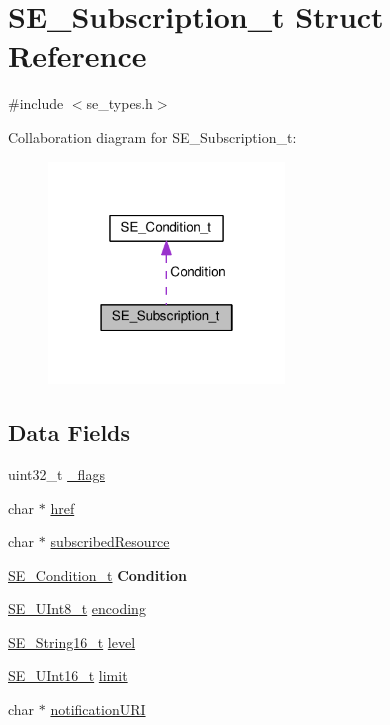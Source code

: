 \hypertarget{structSE__Subscription__t}{}\section{S\+E\+\_\+\+Subscription\+\_\+t Struct Reference}
\label{structSE__Subscription__t}


{\ttfamily \#include $<$se\+\_\+types.\+h$>$}



Collaboration diagram for S\+E\+\_\+\+Subscription\+\_\+t\+:\nopagebreak
\begin{figure}[H]
\begin{center}
\leavevmode
\includegraphics[width=178pt]{structSE__Subscription__t__coll__graph}
\end{center}
\end{figure}
\subsection*{Data Fields}
\begin{DoxyCompactItemize}
\item 
uint32\+\_\+t \hyperlink{group__Subscription_ga3ed789b5419270cc9a8a5534048f9da9}{\+\_\+flags}
\item 
char $\ast$ \hyperlink{group__Subscription_ga68652b485c042e80274c1c8cd71c9d46}{href}
\item 
char $\ast$ \hyperlink{group__Subscription_ga6bb29c2c4620a20e0162662014161d18}{subscribed\+Resource}
\item 
\hyperlink{structSE__Condition__t}{S\+E\+\_\+\+Condition\+\_\+t} {\bfseries Condition}
\item 
\hyperlink{group__UInt8_gaf7c365a1acfe204e3a67c16ed44572f5}{S\+E\+\_\+\+U\+Int8\+\_\+t} \hyperlink{group__Subscription_ga96241742b8da02d3964190abedf7ec22}{encoding}
\item 
\hyperlink{group__String16_ga96799b35e03c3e6545eb138a7f879015}{S\+E\+\_\+\+String16\+\_\+t} \hyperlink{group__Subscription_gab7978f478f8d68b3c5d1a4f18b13d2ed}{level}
\item 
\hyperlink{group__UInt16_gac68d541f189538bfd30cfaa712d20d29}{S\+E\+\_\+\+U\+Int16\+\_\+t} \hyperlink{group__Subscription_ga554e08734299558c7ce58d97a8a27a8d}{limit}
\item 
char $\ast$ \hyperlink{group__Subscription_gaa9e106fec3c507732a98db50afb9cc34}{notification\+U\+RI}
\end{DoxyCompactItemize}


